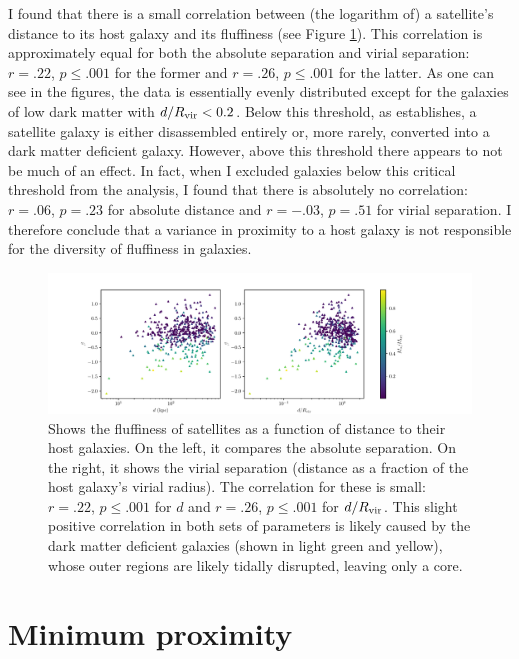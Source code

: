 I found that there is a small correlation between (the logarithm of) a satellite's distance to its host galaxy and its fluffiness (see Figure \ref{fig:beta-d}). This correlation is approximately equal for both the absolute separation and virial separation: $r = .22$, $p \leq .001$ for the former and $r = .26$, $p \leq .001$ for the latter. As one can see in the figures, the data is essentially evenly distributed except for the galaxies of low dark matter with $d / R_{\rm{vir}} < 0.2$. Below this threshold, as \cite{morenoGalaxiesLackingDark2022} establishes, a satellite galaxy is either disassembled entirely or, more rarely, converted into a dark matter deficient galaxy. However, above this threshold there appears to not be much of an effect. In fact, when I excluded galaxies below this critical threshold from the analysis, I found that there is absolutely no correlation: $r = .06$, $p = .23$ for absolute distance and $r = -.03$, $p = .51$ for virial separation. I therefore conclude that a variance in proximity to a host galaxy is not responsible for the diversity of fluffiness in galaxies.

\begin{figure}
    \centering
    \includegraphics*[width=\textwidth*11/10]{figs/me/beta-d.pdf}
    \caption{
        Shows the fluffiness of satellites as a function of distance to their host galaxies. On the left, it compares the absolute separation. On the right, it shows the virial separation (distance as a fraction of the host galaxy's virial radius). The correlation for these is small: $r = .22$, $p \leq .001$ for $d$ and $r = .26$, $p \leq .001$ for $d / R_{\rm{vir}}$. This slight positive correlation in both sets of parameters is likely caused by the dark matter deficient galaxies (shown in light green and yellow), whose outer regions are likely tidally disrupted, leaving only a core.
    }
    \label{fig:beta-d}
\end{figure}


\section{Minimum proximity}

